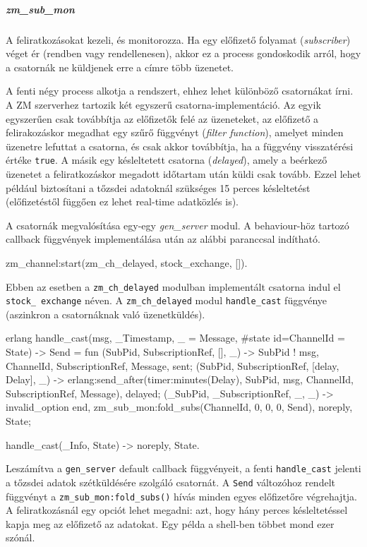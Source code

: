 \documentclass[12pt, a4paper, oneside]{book}
\begin{document}
\subparagraph{zm\_sub\_mon} A feliratkozásokat kezeli, és monitorozza. Ha egy
előfizető folyamat (\emph{subscriber}) véget ér (rendben vagy rendellenesen),
akkor ez a process gondoskodik arról, hogy a csatornák ne küldjenek erre a
címre több üzenetet.

A fenti négy process alkotja a rendszert, ehhez lehet különböző csatornákat
írni. A ZM szerverhez tartozik két egyszerű csatorna-implementáció. Az egyik
egyszerűen csak továbbítja az előfizetők felé az üzeneteket, az előfizető a
felirakozáskor megadhat egy szűrő függvényt (\emph{filter function}), amelyet
minden üzenetre lefuttat a csatorna, és csak akkor továbbítja, ha a függvény
visszatérési értéke \texttt{true}. A másik egy késleltetett csatorna
(\emph{delayed}), amely a beérkező üzenetet a feliratkozáskor megadott
időtartam után küldi csak tovább. Ezzel lehet például biztosítani a tőzsdei
adatoknál szükséges 15 perces késleltetést (előfizetéstől függően ez lehet
real-time adatközlés is).

A csatornák megvalósítása egy-egy \emph{gen\_server} modul. A behaviour-höz
tartozó callback függvények implementálása után az alábbi paranccsal indítható.

\begin{code}{}{}
zm_channel:start(zm_ch_delayed, stock_exchange, []).
\end{code}

Ebben az esetben a \texttt{zm\_ch\_delayed} modulban implementált csatorna indul el
\texttt{stock\_ exchange} néven. A \texttt{zm\_ch\_delayed} modul \texttt{handle\_cast}
függvénye (aszinkron a csatornáknak való üzenetküldés). 

\begin{code}{erlang}{}
handle_cast({msg, {_Timestamp, _} = Message}, 
            #state{ id=ChannelId } = State) ->
  Send = fun
    ({SubPid, SubscriptionRef, []}, _) ->
      SubPid ! {msg, {ChannelId, SubscriptionRef}, Message},
      sent;
    ({SubPid, SubscriptionRef, [{delay, Delay}]}, _) ->
      erlang:send_after(timer:minutes(Delay), 
                        SubPid, 
                        {msg, {ChannelId, SubscriptionRef}, 
                        Message}),
      delayed;
    ({_SubPid, _SubscriptionRef, _}, _) ->
      invalid_option
  end,
  zm_sub_mon:fold_subs(ChannelId, {0, 0, 0}, Send),
  {noreply, State};

handle_cast(_Info, State) ->
  {noreply, State}.
\end{code}

Leszámítva a \texttt{gen\_server} default callback függvényeit, a fenti
\texttt{handle\_cast} jelenti a tőzsdei adatok szétküldésére szolgáló
csatornát. A \texttt{Send} változóhoz rendelt függvényt a
\texttt{zm\_sub\_mon:fold\_subs()} hívás minden egyes előfizetőre végrehajtja. A
feliratkozásnál egy opciót lehet megadni: azt, hogy hány perces késleltetéssel
kapja meg az előfizető az adatokat. Egy példa a shell-ben többet mond ezer
szónál. 
\end{document}
